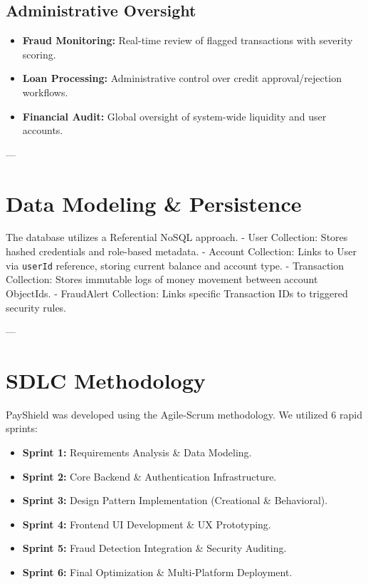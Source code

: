 \documentclass[11pt,a4paper]{article}
\begin{document}
\subsection{Administrative Oversight}
\begin{itemize}
    \item \textbf{Fraud Monitoring:} Real-time review of flagged transactions with severity scoring.
    \item \textbf{Loan Processing:} Administrative control over credit approval/rejection workflows.
    \item \textbf{Financial Audit:} Global oversight of system-wide liquidity and user accounts.
\end{itemize}

---

\section{Data Modeling \& Persistence}
The database utilizes a Referential NoSQL approach. 
- User Collection: Stores hashed credentials and role-based metadata.
- Account Collection: Links to User via \texttt{userId} reference, storing current balance and account type.
- Transaction Collection: Stores immutable logs of money movement between account ObjectIds.
- FraudAlert Collection: Links specific Transaction IDs to triggered security rules.

---

\section{SDLC Methodology}
PayShield was developed using the Agile-Scrum methodology. We utilized 6 rapid sprints:
\begin{itemize}
    \item \textbf{Sprint 1:} Requirements Analysis \& Data Modeling.
    \item \textbf{Sprint 2:} Core Backend \& Authentication Infrastructure.
    \item \textbf{Sprint 3:} Design Pattern Implementation (Creational & Behavioral).
    \item \textbf{Sprint 4:} Frontend UI Development \& UX Prototyping.
    \item \textbf{Sprint 5:} Fraud Detection Integration & Security Auditing.
    \item \textbf{Sprint 6:} Final Optimization \& Multi-Platform Deployment.
\end{itemize}
\end{document}
